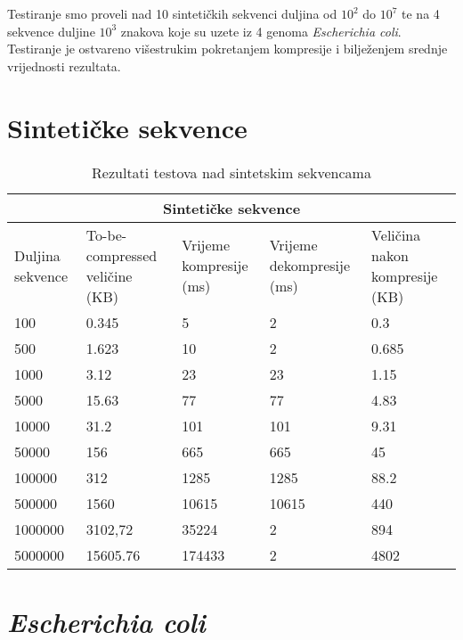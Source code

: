 Testiranje smo proveli nad 10 sintetičkih sekvenci duljina od $10^2$ do $10^7$ te na 4 sekvence duljine $10^3$ znakova koje su uzete iz 4 genoma \textit{Escherichia coli}. Testiranje je ostvareno višestrukim pokretanjem kompresije i bilježenjem srednje vrijednosti rezultata.

\section{Sintetičke sekvence}

\begin{table}[h!]
\centering
\begin{tabular}{ |p{3cm}|p{3cm}|p{3cm}|p{3cm}|p{3cm}|  }
	\hline
	\multicolumn{5}{|c|}{Sintetičke sekvence} \\
	\hline
	Duljina sekvence& To-be-compressed veličine (KB)&Vrijeme kompresije (ms)&Vrijeme dekompresije (ms) & Veličina nakon kompresije (KB)\\
	\hline
	100 &  0.345 & 5 & 2 & 0.3\\
	\hline
	500 &  1.623 & 10 & 2 & 0.685\\
	\hline
	1000 &  3.12 & 23 & 23 & 1.15\\
	\hline
	5000 &  15.63 & 77 & 77 & 4.83\\
	\hline
	10000 &  31.2 & 101 & 101 & 9.31\\
	\hline
	50000 &  156 & 665 & 665 & 45\\
	\hline
	100000 &  312 & 1285 & 1285 & 88.2\\
	\hline
	500000 &  1560 & 10615 & 10615 & 440\\
	\hline
	1000000 &  3102,72 & 35224 & 2 & 894\\
	\hline
	5000000 &  15605.76 & 174433 & 2 & 4802\\
	\hline
\end{tabular}
\caption{Rezultati testova nad sintetskim sekvencama}
\label{table:1}
\end{table}
\pagebreak
\section{\textit{Escherichia coli}}

